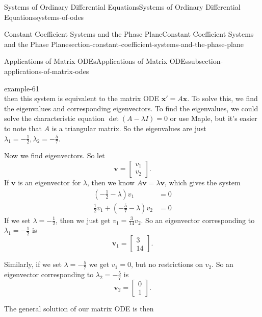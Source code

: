 \documentclass[oneside,10pt,]{book}
\numberwithin{equation}{section}
\renewcommand{\vec}[1]{\mathbf{#1}}
\newcommand{\amp}{&}
\begin{document}
\begin{chapterptx}{Systems of Ordinary Differential Equations}{}{Systems of Ordinary Differential Equations}{}{}{systems-of-odes}
\begin{sectionptx}{Constant Coefficient Systems and the Phase Plane}{}{Constant Coefficient Systems and the Phase Plane}{}{}{section-constant-coefficient-systems-and-the-phase-plane}
\begin{subsectionptx}{Applications of Matrix ODEs}{}{Applications of Matrix ODEs}{}{}{subsection-applications-of-matrix-odes}
\begin{example}{}{example-61}
\begin{equation*}
\end{equation*}
then this system is equivalent to the matrix ODE \(\vec{x}' = A\vec{x}\). To solve this, we find the eigenvalues and corresponding eigenvectors. To find the eigenvalues, we could solve the characteristic equation \(\det(A-\lambda I) = 0\) or use Maple, but it's easier to note that \(A\) is a triangular matrix. So the eigenvalues are just \(\lambda_{1} = -\frac{1}{2},\lambda_{2} = -\frac{5}{7}\).%
\par
\hypertarget{p-362}{}%
Now we find eigenvectors. So let%
\begin{equation*}
\vec{v} = \begin{bmatrix}v_{1} \\ v_{2}\end{bmatrix}.
\end{equation*}
If \(\vec{v}\) is an eigenvector for \(\lambda\), then we know \(A\vec{v} = \lambda\vec{v}\), which gives the system%
\begin{align*}
(-\frac{1}{2}-\lambda)v_{1} \amp = 0\\
\frac{1}{2}v_{1} + (-\frac{5}{7}-\lambda)v_{2} \amp = 0
\end{align*}
If we set \(\lambda=-\frac{1}{2}\), then we just get \(v_{1} = \frac{3}{14}v_{2}\). So an eigenvector corresponding to \(\lambda_{1} = -\frac{1}{2}\) is%
\begin{equation*}
\vec{v}_{1} = \begin{bmatrix}3\\14\end{bmatrix}.
\end{equation*}
%
\par
\hypertarget{p-363}{}%
Similarly, if we set \(\lambda=-\frac{5}{7}\) we get \(v_{1} = 0\), but no restrictions on \(v_{2}\). So an eigenvector corresponding to \(\lambda_{2} = -\frac{5}{7}\) is%
\begin{equation*}
\vec{v}_{2} = \begin{bmatrix}0\\1\end{bmatrix}.
\end{equation*}
%
\par
\hypertarget{p-364}{}%
The general solution of our matrix ODE is then%
\begin{equation*}

\end{equation*}
\end{example}
\end{subsectionptx}
\end{sectionptx}
\end{chapterptx}
\end{document}
